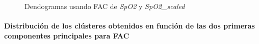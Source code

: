 \begin{figure}[ht]
    \centering
    \hfill
    \caption{Dendogramas usando FAC de \textit{SpO2} y \textit{SpO2\_scaled}}\label{fig:acf_den_spo2}
\end{figure}

\paragraph{Distribución de los clústeres obtenidos en función de las dos primeras componentes principales para FAC}

